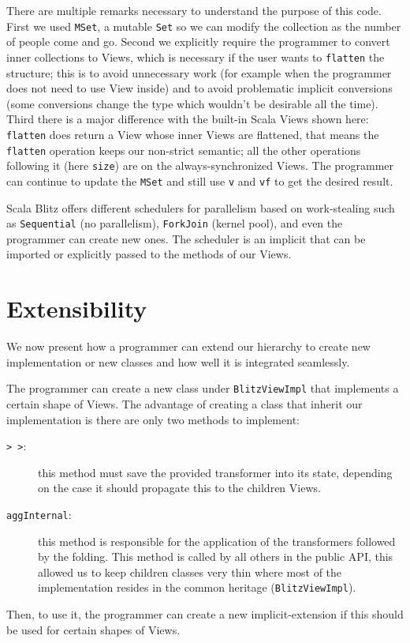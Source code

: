 \documentclass[a4paper,12pt,twocolumn]{article}
\begin{document}
There are multiple remarks necessary to understand the purpose of this code.
First we used \verb|MSet|, a mutable \verb|Set| so we can modify the collection as the number of people come and go.
Second we explicitly require the programmer to convert inner collections to Views, which is necessary if the user wants to \verb|flatten| the structure; this is to avoid unnecessary work (for example when the programmer does not need to use View inside) and to avoid problematic implicit conversions (some conversions change the type which wouldn't be desirable all the time).
Third there is a major difference with the built-in Scala Views shown here: \verb|flatten| does return a View whose inner Views are flattened, that means the \verb|flatten| operation keeps our non-strict semantic; all the other operations following it (here \verb|size|) are on the always-synchronized Views.
The programmer can continue to update the \verb|MSet| and still use \verb|v| and \verb|vf| to get the desired result.

Scala Blitz offers different schedulers for parallelism based on work-stealing such as \verb|Sequential| (no parallelism), \verb|ForkJoin| (kernel pool), and even the programmer can create new ones.
The scheduler is an implicit that can be imported or explicitly passed to the methods of our Views.


\section{Extensibility}
\label{sec:ext}
We now present how a programmer can extend our hierarchy to create new implementation or new classes and how well it is integrated seamlessly.

The programmer can create a new class under \verb|BlitzViewImpl| that implements a certain shape of Views.
The advantage of creating a class that inherit our implementation is there are only two methods to implement:
\begin{description}
    \item[{\tt >\,>}:] this method must save the provided transformer into its state, depending on the case it should propagate this to the children Views.
    \item[{\tt aggInternal}:] this method is responsible for the application of the transformers followed by the folding.
        This method is called by all others in the public API, this allowed us to keep children classes very thin where most of the implementation resides in the common heritage (\verb|BlitzViewImpl|).
\end{description}
Then, to use it, the programmer can create a new implicit-extension if this should be used for certain shapes of Views.
\end{document}
